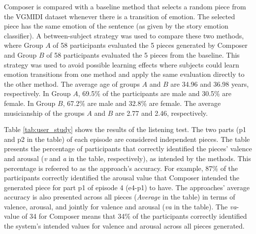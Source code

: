 Composer is compared with a baseline method that selects a random piece from the VGMIDI dataset whenever there is a transition of emotion. The selected piece has the same emotion of the sentence (as given by the story emotion classifier). A between-subject strategy was used to compare these two methods, where Group $A$ of 58 participants evaluated the 5 pieces generated by Composer and Group $B$ of 58 participants evaluated the 5 pieces from the baseline. This strategy was used to avoid possible learning effects where subjects could learn emotion transitions from one method and apply the same evaluation directly to the other method. The average age of groups $A$ and $B$ are 34.96 and 36.98 years, respectively. In Group $A$, 69.5\% of the participants are male and 30.5\% are female. In Group $B$, 67.2\% are male and 32.8\% are female. The average musicianship of the groups $A$ and $B$ are 2.77 and 2.46, respectively.

Table \ref{tab:user_study} shows the results of the listening test. The two parts (p1 and p2 in the table) of each episode are considered independent pieces. The table presents the percentage of participants that correctly identified the pieces' valence and arousal (\textit{v} and \textit{a} in the table, respectively), as intended by the methods. This percentage is refeered to as the approach's accuracy. For example, 87\% of the participants correctly identified the arousal value that Composer intended the generated piece for part p1 of episode 4 (e4-p1) to have. The approaches' average accuracy is also presented across all pieces (\textit{Average} in the table) in terms of valence, arousal, and jointly for valence and arousal (\textit{va} in the table). The \textit{va}-value of 34 for Composer means that 34\% of the participants correctly identified the system's intended values for valence and arousal across all pieces generated.

